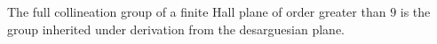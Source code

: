 The full collineation group of a finite Hall plane of order greater than $9$ is the group inherited under derivation from the desarguesian plane.
